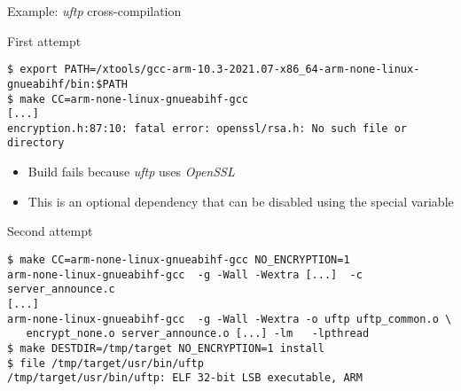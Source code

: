 \begin{frame}[fragile]{Example: {\em uftp} cross-compilation}
  \begin{block}{First attempt}
    {\scriptsize
\begin{verbatim}
$ export PATH=/xtools/gcc-arm-10.3-2021.07-x86_64-arm-none-linux-gnueabihf/bin:$PATH
$ make CC=arm-none-linux-gnueabihf-gcc
[...]
encryption.h:87:10: fatal error: openssl/rsa.h: No such file or directory
\end{verbatim}
    }
  \end{block}

  \begin{itemize}
  \item Build fails because {\em uftp} uses {\em OpenSSL}
  \item This is an optional dependency that can be disabled using the
    special  variable 
  \end{itemize}

  \begin{block}{Second attempt}
    {\scriptsize
\begin{verbatim}
$ make CC=arm-none-linux-gnueabihf-gcc NO_ENCRYPTION=1
arm-none-linux-gnueabihf-gcc  -g -Wall -Wextra [...]  -c server_announce.c
[...]
arm-none-linux-gnueabihf-gcc  -g -Wall -Wextra -o uftp uftp_common.o \
   encrypt_none.o server_announce.o [...] -lm   -lpthread
$ make DESTDIR=/tmp/target NO_ENCRYPTION=1 install
$ file /tmp/target/usr/bin/uftp
/tmp/target/usr/bin/uftp: ELF 32-bit LSB executable, ARM
\end{verbatim}
    }
  \end{block}
\end{frame}

